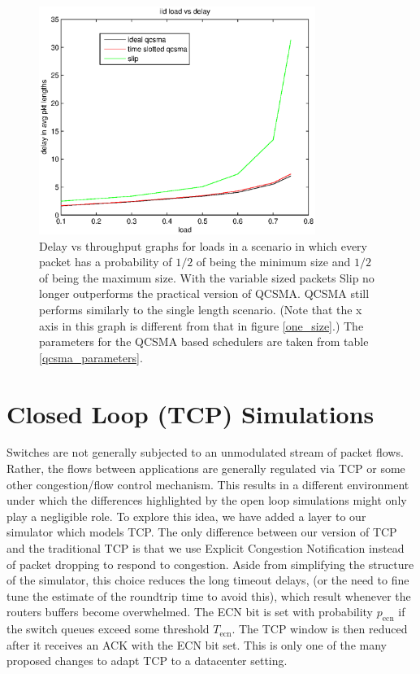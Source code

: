 \documentclass{IEEEtran}%
\begin{document}
\begin{figure}%
	 \includegraphics[width=90mm]{vs_load.eps}
	 \caption{Delay vs throughput graphs for loads in a scenario in which every packet has a probability of $1/2$ of being the minimum size and $1/2$ of being the maximum size. With the variable sized packets Slip no longer outperforms the practical version of QCSMA.  QCSMA still performs similarly to the single length scenario.  (Note that the x axis in this graph is different from that in figure \ref{one_size}.) The parameters for the QCSMA based schedulers are taken from table \ref{qcsma_parameters}.} 	
	\label{variable_size}
\end{figure}

\section{Closed Loop (TCP) Simulations} \label{closed}


Switches are not generally subjected to an unmodulated stream of packet flows.  Rather, the flows between applications are generally regulated via TCP or some other congestion/flow control mechanism.  This results in a different environment under which the differences highlighted by the open loop simulations might only play a negligible role.  To explore this idea, we have added a layer to our simulator which models TCP.  The only difference between our version of TCP and the traditional TCP is that we use Explicit Congestion Notification instead of packet dropping to respond to congestion.  Aside from simplifying the structure of the simulator, this choice reduces the long timeout delays, (or the need to fine tune the estimate of the roundtrip time to avoid this), which result whenever the routers buffers become overwhelmed.  The ECN bit is set with probability $p_{\text{ecn}}$ if the switch queues exceed some threshold $T_{\text{ecn}}$.  The TCP window is then reduced after it receives an ACK with the ECN bit set.  This is only one of the many proposed changes to adapt TCP to a datacenter setting.
\end{document}
